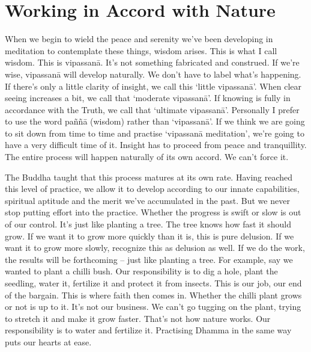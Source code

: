 \section{Working in Accord with Nature}

When we begin to wield the peace and serenity we've been developing in meditation to contemplate these things, wisdom arises. This is what I call wisdom. This is vipassan\=a. It's not something fabricated and construed. If we're wise, vipassan\=a will develop naturally. We don't have to label what's happening. If there's only a little clarity of insight, we call this `little vipassan\=a'. When clear seeing increases a bit, we call that `moderate vipassan\=a'. If knowing is fully in accordance with the Truth, we call that `ultimate vipassan\=a'. Personally I prefer to use the word pa\~n\~n\=a (wisdom) rather than `vipassan\=a'. If we think we are going to sit down from time to time and practise `vipassan\=a meditation', we're going to have a very difficult time of it. Insight has to proceed from peace and tranquillity. The entire process will happen naturally of its own accord. We can't force it.

The Buddha taught that this process matures at its own rate. Having reached this level of practice, we allow it to develop according to our innate capabilities, spiritual aptitude and the merit we've accumulated in the past. But we never stop putting effort into the practice. Whether the progress is swift or slow is out of our control. It's just like planting a tree. The tree knows how fast it should grow. If we want it to grow more quickly than it is, this is pure delusion. If we want it to grow more slowly, recognize this as delusion as well. If we do the work, the results will be forthcoming -- just like planting a tree. For example, say we wanted to plant a chilli bush. Our responsibility is to dig a hole, plant the seedling, water it, fertilize it and protect it from insects. This is our job, our end of the bargain. This is where faith then comes in. Whether the chilli plant grows or not is up to it. It's not our business. We can't go tugging on the plant, trying to stretch it and make it grow faster. That's not how nature works. Our responsibility is to water and fertilize it. Practising Dhamma in the same way puts our hearts at ease.

